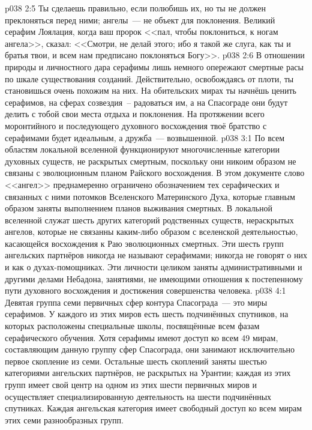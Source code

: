 \vs p038 2:5 \pc Ты сделаешь правильно, если полюбишь их, но ты не должен преклоняться перед ними; ангелы~--- не объект для поклонения. Великий серафим Лоялация, когда ваш пророк <<пал, чтобы поклониться, к ногам ангела>>, сказал: <<Смотри, не делай этого; ибо я такой же слуга, как ты и братья твои, и всем нам предписано поклоняться Богу>>.
\vs p038 2:6 В отношении природы и личностного дара серафимы лишь немного опережают смертные расы по шкале существования созданий. Действительно, освобождаясь от плоти, ты становишься очень похожим на них. На обительских мирах ты начнёшь ценить серафимов, на сферах созвездия~-- радоваться им, а на Спасограде они будут делить с тобой свои места отдыха и поклонения. На протяжении всего моронтийного и последующего духовного восхождения твоё братство с серафимами будет идеальным, а дружба~--- возвышенной.
\vs p038 3:1 По всем областям локальной вселенной функционируют многочисленные категории духовных существ, не раскрытых смертным, поскольку они никоим образом не связаны с эволюционным планом Райского восхождения. В этом документе слово <<ангел>> преднамеренно ограничено обозначением тех серафических и связанных с ними потомков Вселенского Материнского Духа, которые главным образом заняты выполнением планов выживания смертных. В локальной вселенной служат шесть других категорий родственных существ, нераскрытых ангелов, которые не связанны каким\hyp{}либо образом с вселенской деятельностью, касающейся восхождения к Раю эволюционных смертных. Эти шесть групп ангельских партнёров никогда не называют серафимами; никогда не говорят о них и как о духах\hyp{}помощниках. Эти личности целиком заняты административными и другими делами Небадона, занятиями, не имеющими отношения к постепенному пути духовного восхождения и достижения совершенства человека.
\vs p038 4:1 Девятая группа семи первичных сфер контура Спасограда~--- это миры серафимов. У каждого из этих миров есть шесть подчинённых спутников, на которых расположены специальные школы, посвящённые всем фазам серафического обучения. Хотя серафимы имеют доступ ко всем 49 мирам, составляющим данную группу сфер Спасограда, они занимают исключительно первое скопление из семи. Остальные шесть скоплений заняты шестью категориями ангельских партнёров, не раскрытых на Урантии; каждая из этих групп имеет свой центр на одном из этих шести первичных миров и осуществляет специализированную деятельность на шести подчинённых спутниках. Каждая ангельская категория имеет свободный доступ ко всем мирам этих семи разнообразных групп.
